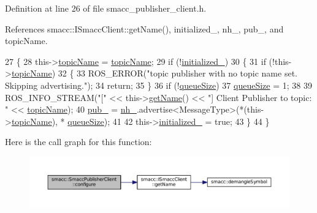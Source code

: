 Definition at line 26 of file smacc\+\_\+publisher\+\_\+client.\+h.



References smacc\+::\+I\+Smacc\+Client\+::get\+Name(), initialized\+\_\+, nh\+\_\+, pub\+\_\+, and topic\+Name.


\begin{DoxyCode}
27   \{
28     this->\hyperlink{classsmacc_1_1SmaccPublisherClient_a4b8401543c3d532e81453c9106ddaefc}{topicName} = \hyperlink{classsmacc_1_1SmaccPublisherClient_a4b8401543c3d532e81453c9106ddaefc}{topicName};
29     \textcolor{keywordflow}{if} (!\hyperlink{classsmacc_1_1SmaccPublisherClient_affbfbaa739a6de9f118c551c56b09dfe}{initialized\_})
30     \{
31       \textcolor{keywordflow}{if} (!this->\hyperlink{classsmacc_1_1SmaccPublisherClient_a4b8401543c3d532e81453c9106ddaefc}{topicName})
32       \{
33         ROS\_ERROR(\textcolor{stringliteral}{"topic publisher with no topic name set. Skipping advertising."});
34         \textcolor{keywordflow}{return};
35       \}
36       \textcolor{keywordflow}{if} (!\hyperlink{classsmacc_1_1SmaccPublisherClient_ad7a0aa074031d2c2ea332a4d517dbae5}{queueSize})
37         \hyperlink{classsmacc_1_1SmaccPublisherClient_ad7a0aa074031d2c2ea332a4d517dbae5}{queueSize} = 1;
38 
39             ROS\_INFO\_STREAM(\textcolor{stringliteral}{"["} << this->\hyperlink{classsmacc_1_1ISmaccClient_a20846aabfd1de832aa27d7a8237a1742}{getName}() << \textcolor{stringliteral}{"] Client Publisher to topic: "} << 
      \hyperlink{classsmacc_1_1SmaccPublisherClient_a4b8401543c3d532e81453c9106ddaefc}{topicName});
40       \hyperlink{classsmacc_1_1SmaccPublisherClient_a674fc5715c4983d093c8ae387232ae55}{pub\_} = \hyperlink{classsmacc_1_1SmaccPublisherClient_aaebda6a40634daf81c80add02f938ad3}{nh\_}.advertise<MessageType>(*(this->\hyperlink{classsmacc_1_1SmaccPublisherClient_a4b8401543c3d532e81453c9106ddaefc}{topicName}), *
      \hyperlink{classsmacc_1_1SmaccPublisherClient_ad7a0aa074031d2c2ea332a4d517dbae5}{queueSize});
41 
42       this->\hyperlink{classsmacc_1_1SmaccPublisherClient_affbfbaa739a6de9f118c551c56b09dfe}{initialized\_} = \textcolor{keyword}{true};
43     \}
44   \}
\end{DoxyCode}


Here is the call graph for this function\+:
\nopagebreak
\begin{figure}[H]
\begin{center}
\leavevmode
\includegraphics[width=350pt]{classsmacc_1_1SmaccPublisherClient_a9614fbcc4d566ad8b1b5007727bce2c1_cgraph}
\end{center}
\end{figure}


